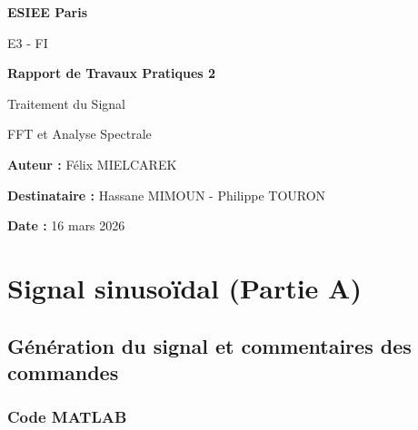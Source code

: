 \documentclass[12pt,a4paper]{article}
\begin{document}
\begin{titlepage}
    \centering
    \vspace{2cm}
    
    {\huge\bfseries ESIEE Paris\par}
    \vspace{1cm}
    {\Large E3 - FI\par}
    \vspace{2cm}
    
    {\Huge\bfseries Rapport de Travaux Pratiques 2\par}
    \vspace{0.5cm}
    {\Large Traitement du Signal\par}
    \vspace{0.5cm}
    {\large FFT et Analyse Spectrale\par}
    \vspace{3cm}
    
    \begin{flushleft}
        {\Large
        \textbf{Auteur :} Félix MIELCAREK\par
        \vspace{0.5cm}
        \textbf{Destinataire :} Hassane MIMOUN - Philippe TOURON\par
        \vspace{0.5cm}
        \textbf{Date :} 16 mars 2026\par
        }
    \end{flushleft}
    
    \vfill
    
\end{titlepage}

\tableofcontents
\newpage

\section{Signal sinusoïdal (Partie A)}

\subsection{Génération du signal et commentaires des commandes}

\subsubsection{Code MATLAB}
\end{document}
